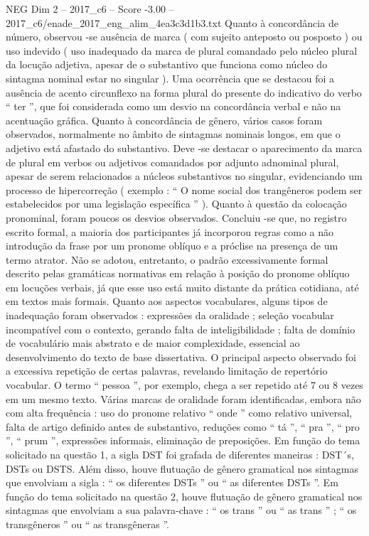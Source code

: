 \begin{textsample}{NEG Dim 2 – 2017\_c6 – Score -3.00 – 2017\_c6/enade\_2017\_eng\_alim\_4ea3c3d1b3.txt}
Quanto à concordância de número, observou -se ausência de marca ( com sujeito anteposto ou posposto ) ou uso indevido ( uso inadequado da marca de plural comandado pelo núcleo plural da locução adjetiva, apesar de o substantivo que funciona como núcleo do sintagma nominal estar no singular ).
Uma ocorrência que se destacou foi a ausência de acento circunflexo na forma plural do presente do indicativo do verbo “ ter ”, que foi considerada como um desvio na concordância verbal e não na acentuação gráfica.
Quanto à concordância de gênero, vários casos foram observados, normalmente no âmbito de sintagmas nominais longos, em que o adjetivo está afastado do substantivo.
Deve -se destacar o aparecimento da marca de plural em verbos ou adjetivos comandados por adjunto adnominal plural, apesar de serem relacionados a núcleos substantivos no singular, evidenciando um processo de hipercorreção ( exemplo : “ O nome social dos trangêneros podem ser estabelecidos por uma legislação específica ” ).
Quanto à questão da colocação pronominal, foram poucos os desvios observados.
Concluiu -se que, no registro escrito formal, a maioria dos participantes já incorporou regras como a não introdução da frase por um pronome oblíquo e a próclise na presença de um termo atrator.
Não se adotou, entretanto, o padrão excessivamente formal descrito pelas gramáticas normativas em relação à posição do pronome oblíquo em locuções verbais, já que esse uso está muito distante da prática cotidiana, até em textos mais formais.
Quanto aos aspectos vocabulares, alguns tipos de inadequação foram observados : expressões da oralidade ; seleção vocabular incompatível com o contexto, gerando falta de inteligibilidade ; falta de domínio de vocabulário mais abstrato e de maior complexidade, essencial ao desenvolvimento do texto de base dissertativa.
O principal aspecto observado foi a excessiva repetição de certas palavras, revelando limitação de repertório vocabular.
O termo “ pessoa ”, por exemplo, chega a ser repetido até 7 ou 8 vezes em um mesmo texto.
Várias marcas de oralidade foram identificadas, embora não com alta frequência : uso do pronome relativo “ onde ” como relativo universal, falta de artigo definido antes de substantivo, reduções como “ tá ”, “ pra ”, “ pro ”, “ prum ”, expressões informais, eliminação de preposições.
Em função do tema solicitado na questão 1, a sigla DST foi grafada de diferentes maneiras : DST´s, DSTs ou DSTS.
Além disso, houve flutuação de gênero gramatical nos sintagmas que envolviam a sigla : “ os diferentes DSTs ” ou “ as diferentes DSTs ”.
Em função do tema solicitado na questão 2, houve flutuação de gênero gramatical nos sintagmas que envolviam a sua palavra-chave : “ os trans ” ou “ as trans ” ; “ os transgêneros ” ou “ as transgêneras ”.

\end{textsample}
